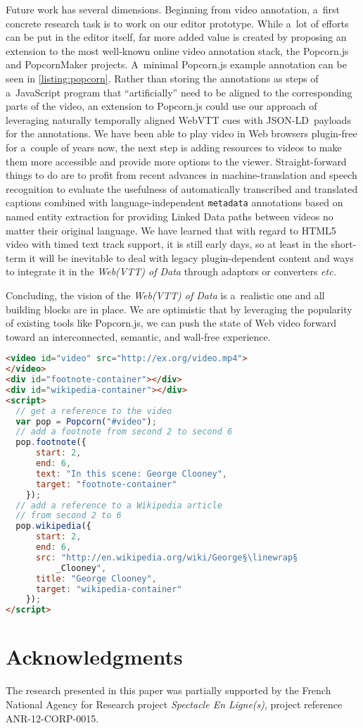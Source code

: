 \documentclass{sig-alternate-ceur}
\newcommand{\linewrap}{\raisebox{-.6ex}{\textcolor{grey}{$\hookleftarrow$}}}
\def\JSONLD{\mbox{JSON-LD}}
\begin{document}
Future work has several dimensions.
Beginning from video annotation, a~first concrete research task
is to work on our editor prototype.
While a~lot of efforts can be put in the editor itself,
far more added value is created by proposing an extension to the
most well-known online video annotation stack, the Popcorn.js 
and PopcornMaker projects.
A~minimal Popcorn.js example annotation can be seen in \autoref{listing:popcorn}.
Rather than storing the annotations as steps of a~JavaScript program
that ``artificially'' need to be aligned to the corresponding parts of the video,
an extension to Popcorn.js could use our approach of leveraging
naturally temporally aligned WebVTT cues with \JSONLD\ payloads for the annotations.
We have been able to play video in Web browsers plugin-free
for a~couple of years now, the next step is adding resources to videos
to make them more accessible and provide more options to the viewer.
Straight-forward things to do are to profit from recent advances
in machine-translation and speech recognition
to evaluate the usefulness of automatically
transcribed and translated captions combined with language-independent \texttt{metadata}
annotations based on named entity extraction for providing Linked Data
paths between videos no matter their original language.
We have learned that with regard to HTML5 video with timed text track support,
it is still early days, so at least in the short-term
it will be inevitable to deal with legacy plugin-dependent content
and ways to integrate it in the \emph{Web(VTT) of Data}
through adaptors or converters \emph{etc.}

Concluding, the vision of the \emph{Web(VTT) of Data} is a~realistic one
and all building blocks are in place.
We are optimistic that by leveraging the popularity
of existing tools like Popcorn.js, we can push the state of Web video forward
toward an interconnected, semantic, and wall-free experience.  

\begin{lstlisting}[caption={Popcorn.js example},
  label=listing:popcorn, float=h!, language=html]
<video id="video" src="http://ex.org/video.mp4">
</video>
<div id="footnote-container"></div>
<div id="wikipedia-container"></div>
<script>
  // get a reference to the video
  var pop = Popcorn("#video");
  // add a footnote from second 2 to second 6
  pop.footnote({
      start: 2,
      end: 6,
      text: "In this scene: George Clooney",
      target: "footnote-container"
    });
  // add a reference to a Wikipedia article
  // from second 2 to 6  
  pop.wikipedia({
      start: 2,
      end: 6,
      src: "http://en.wikipedia.org/wiki/George§\linewrap§
          _Clooney",
      title: "George Clooney",
      target: "wikipedia-container"
    });    
</script>
\end{lstlisting}

\section*{Acknowledgments}

The research presented in this paper was partially supported
by the French National Agency for Research  project
\emph{Spectacle En Ligne(s)}, project reference
\mbox{ANR-12-CORP-0015}.\vfill



\end{document}
